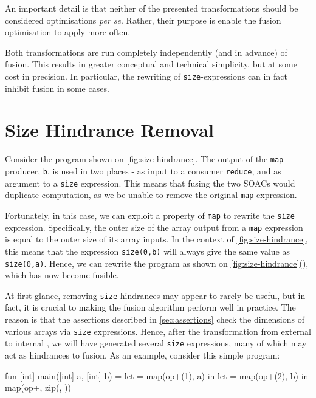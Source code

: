 An important detail is that neither of the presented transformations
should be considered optimisations \textit{per se}.  Rather, their
purpose is enable the fusion optimisation to apply more often.

Both transformations are run completely independently (and in advance)
of fusion.  This results in greater conceptual and technical
simplicity, but at some cost in precision.  In particular, the
rewriting of \texttt{size}-expressions can in fact inhibit fusion in
some cases.

\section{Size Hindrance Removal}
\label{sec:size-hindrance-removal}

Consider the program shown on \cref{fig:size-hindrance}.  The output
of the \texttt{map} producer, \texttt{b}, is used in two places - as
input to a consumer \texttt{reduce}, and as argument to a
\texttt{size} expression.  This means that fusing the two SOACs would
duplicate computation, as we be unable to remove the original
\texttt{map} expression.

Fortunately, in this case, we can exploit a property of \texttt{map}
to rewrite the \texttt{size} expression.  Specifically, the outer size
of the array output from a \texttt{map} expression is equal to the
outer size of its array inputs.  In the context of
\cref{fig:size-hindrance}, this means that the expression
\texttt{size(0,b)} will always give the same value as
\texttt{size(0,a)}.  Hence, we can rewrite the program as shown on
\cref{fig:size-hindrance}(), which
has now become fusible.

At first glance, removing \texttt{size} hindrances may appear to
rarely be useful, but in fact, it is crucial to making the fusion
algorithm perform well in practice.  The reason is that the assertions
described in \cref{sec:assertions} check the dimensions of various
arrays via \texttt{size} expressions.  Hence, after the transformation
from external to internal \LO{}, we will have generated several
\texttt{size} expressions, many of which may act as hindrances to
fusion.  As an example, consider this simple program:

\begin{colorcode}
fun [int] main([int] a, [int] b) =
  let  = map(op+(1), a) in
  let  = map(op+(2), b) in
  map(op+, zip(, ))
\end{colorcode}

